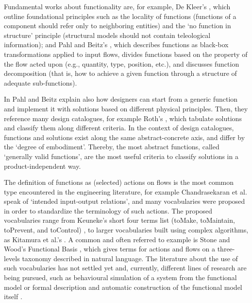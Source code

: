 \documentclass[sw]{iosart2x}
\newcommand{\quotes}[1]{`#1'}
\begin{document}
Fundamental works about functionality are, for example, De Kleer's \cite{de_kleer_how_1984, kleer_qualitative_1984}, which outline foundational principles such as the locality of functions (functions of a component should refer only to neighboring entities) and the \quotes{no function in structure} principle (structural models should not contain teleological information); and Pahl and Beitz's \cite{pahl_engineering_2007}, which describes functions as black-box transformations applied to input flows, divides functions based on the property of the flow acted upon (e.g., quantity, type, position, etc.), and discusses function decomposition (that is, how to achieve a given function through a structure of adequate sub-functions).

In \cite{pahl_engineering_2007} Pahl and Beitz explain also how designers can start from a generic function and implement it with solutions based on different physical principles. 
Then, they reference many design catalogues, for example Roth's \cite{rothKonstruierenMitKonstruktionskatalogen2000}, which tabulate solutions and classify them along different criteria.
In the context of design catalogues, functions and solutions exist along the same abstract-concrete axis, and differ by the \quotes{degree of embodiment}. 
Thereby, the most abstract functions, called \quotes{generally valid functions}, are the most useful criteria to classify solutions in a product-independent way. 

The definition of functions as (selected) actions on flows is the most common type encountered in the engineering literature, for example Chandrasekaran et al. \cite{chandrasekaranFunctionalRepresentationDesign1993} speak of \quotes{intended input-output relations}, and many vocabularies were proposed in order to standardize the terminology of such actions. 
The proposed vocabularies range from Keuneke's short four terms list (toMake, toMaintain, toPrevent, and toControl) \cite{keuneke_device_1991}, to larger vocabularies built using complex algorithms, as Kitamura et al.'s \cite{kitamuraFunctionalConceptOntology2002a}. 
A common and often referred to example is Stone and Wood's Functional Basis \cite{hirtz_functional_2002, stone_development_2000}, which gives terms for actions and flows on a three-levels taxonomy described in natural language.
The literature about the use of such vocabularies has not settled yet and, currently, different lines of research are being pursued, such as behavioural simulation of a system from the functional model \cite{kurtogluGraphBasedFaultIdentification2008} or formal description and automatic construction of the functional model itself \cite{gill_logic_2021,kurtoglu_automating_2010}.
\end{document}
